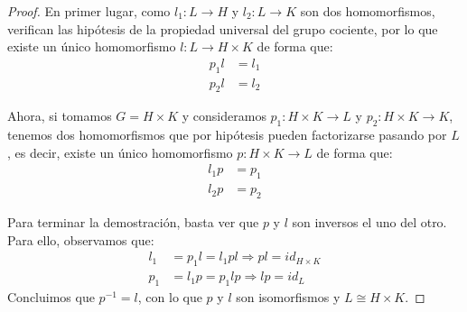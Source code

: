 \begin{teo}
   \begin{proof}
       En primer lugar, como $l_1:L\to H$ y $l_2:L\to K$ son dos homomorfismos, verifican las hipótesis de la propiedad universal del grupo cociente, por lo que existe un único homomorfismo $l:L\to H\times K$ de forma que:
       \begin{align*}
           p_1l &= l_1 \\
           p_2l &= l_2
       \end{align*}
       \begin{figure}[H]
           \centering
       \end{figure}
       Ahora, si tomamos $G = H\times K$ y consideramos $p_1:H\times K\to L$ y $p_2:H\times K\to K$, tenemos dos homomorfismos que por hipótesis pueden factorizarse pasando por $L$, es decir, existe un único homomorfismo $p:H\times K\to L$ de forma que:
       \begin{align*}
           l_1p &= p_1 \\
           l_2p &= p_2
       \end{align*}
       \begin{figure}[H]
           \centering
       \end{figure}
       \noindent
       Para terminar la demostración, basta ver que $p$ y $l$ son inversos el uno del otro. Para ello, observamos que:
       \begin{align*}
           l_1 &= p_1l = l_1pl \Longrightarrow pl = id_{H\times K} \\
           p_1 &= l_1p = p_1lp \Longrightarrow lp = id_L
       \end{align*}
       Concluimos que $p^{-1} = l$, con lo que $p$ y $l$ son isomorfismos y $L\cong H\times K$.
   \end{proof}
\end{teo}

